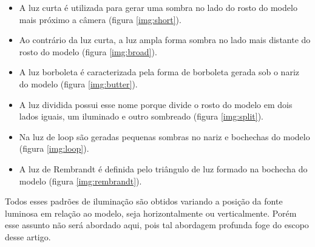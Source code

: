 \documentclass[
	article,			%
	12pt,				%
	oneside,			%
	a4paper,			%
	english,			%
	brazil,				%
	sumario=tradicional
	]{abntex2}
\begin{document}
\begin{itemize}
	\item A luz curta é utilizada para gerar uma sombra no lado do rosto do modelo mais próximo a câmera (figura \ref{img:short}).
	\item Ao contrário da luz curta, a luz ampla forma sombra no lado mais distante do rosto do modelo (figura \ref{img:broad}).
	\item A luz borboleta é caracterizada pela forma de borboleta gerada sob o nariz do modelo (figura \ref{img:butter}).
	\item A luz dividida possui esse nome porque divide o rosto do modelo em dois lados iguais, um iluminado e outro sombreado (figura \ref{img:split}).
	\item Na luz de loop são geradas pequenas sombras no nariz e bochechas do modelo (figura \ref{img:loop}).
	\item A luz de Rembrandt é definida pelo triângulo de luz formado na bochecha do modelo (figura \ref{img:rembrandt}). 
\end{itemize}

Todos esses padrões de iluminação são obtidos variando a posição da fonte luminosa em relação ao modelo, seja horizontalmente ou verticalmente. Porém esse assunto não será abordado aqui, pois tal abordagem profunda foge do escopo desse artigo.
\end{document}
